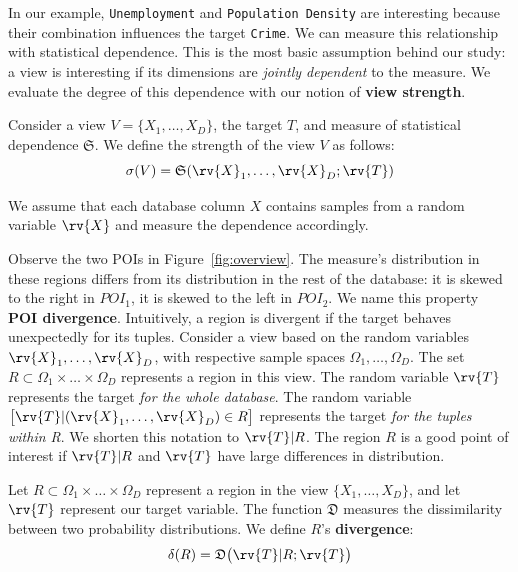 In our example, \texttt{Unemployment} and \texttt{Population Density} are
interesting because their combination influences the target \texttt{Crime}. We
can measure this relationship with statistical dependence. This is the most
basic assumption behind our study: a view is interesting if its dimensions are
\emph{jointly dependent} to the measure. We evaluate the degree of this
dependence with our notion of \textbf{view strength}. 
\begin{definition}
    Consider a view $V = \{X_1, \ldots, X_D\}$, the target $T$, and measure of
    statistical dependence $\mathfrak{S}$.   We
    define the strength of the view $V$ as follows:
    \begin{equation}\label{eq:strengthgen}
        \sigma(V) = \mathfrak{S}(\rv{X}_1, \ldots, \rv{X}_D ; \rv{T})
    \end{equation}
\end{definition}
We assume that each database column $X$ contains samples from a random variable $\rv{X}$ and measure the dependence accordingly. 

Observe the two POIs in Figure~\ref{fig:overview}.  The measure's distribution
in these regions differs from its distribution in the rest of the database: it
is skewed to the right in $POI_1$, it is skewed to the left in $POI_2$. We name
this property \textbf{POI divergence}. Intuitively, a region is divergent if
the target behaves unexpectedly for its tuples.  Consider a view based on the
random variables $\rv{X}_1, \ldots, \rv{X}_D$, with respective sample spaces
$\Omega_1, \ldots, \Omega_D$.  The set $R\subset \Omega_1 \times \ldots \times
\Omega_D$ represents a region in this view.  The random variable $\rv{T}$
represents the target \emph{for the whole database}.  The random variable
$\big[ \rv{T} | (\rv{X}_1, \ldots, \rv{X}_D) \in R \big] $ represents the
target \emph{for the tuples within R}. We shorten this notation to $\rv{T} |
R$. The region $R$ is a good point of interest if $\rv{T} |R $ and $\rv{T}$
have large differences in distribution.
\begin{definition}
    Let $R\subset \Omega_1 \times \ldots \times \Omega_D$ represent a region in
    the view $\{X_1, \ldots, X_D\}$, and let $\rv{T}$ represent our target
    variable. The function $\mathfrak{D}$ measures the dissimilarity between
    two probability distributions. We define $R$'s \textbf{divergence}:
\begin{equation}\label{eq:divergencegen}
    \delta(R) = \mathfrak{D} \big( \rv{T} | R;  \rv{T}\big)
\end{equation}
\end{definition}


